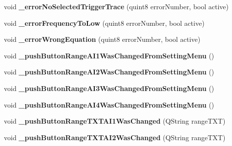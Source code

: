 \begin{DoxyCompactItemize}
\item 
\mbox{\label{class_setting_window_af4dae533a534c486ed9b09ac9bf73613}} 
void {\bfseries \+\_\+error\+No\+Selected\+Trigger\+Trace} (quint8 error\+Number, bool active)
\item 
\mbox{\label{class_setting_window_a6f418e01eac690c8ab0970f5517bda87}} 
void {\bfseries \+\_\+error\+Frequency\+To\+Low} (quint8 error\+Number, bool active)
\item 
\mbox{\label{class_setting_window_ac85c77df564792038d5e11945837efed}} 
void {\bfseries \+\_\+error\+Wrong\+Equation} (quint8 error\+Number, bool active)
\item 
\mbox{\label{class_setting_window_a59bb777c069f6334751b76bac079891c}} 
void {\bfseries \+\_\+push\+Button\+Range\+A\+I1\+Was\+Changed\+From\+Setting\+Menu} ()
\item 
\mbox{\label{class_setting_window_a5466861a6c57c80788da82efc885ae56}} 
void {\bfseries \+\_\+push\+Button\+Range\+A\+I2\+Was\+Changed\+From\+Setting\+Menu} ()
\item 
\mbox{\label{class_setting_window_a0db37304392188ba643dbc1f3035d226}} 
void {\bfseries \+\_\+push\+Button\+Range\+A\+I3\+Was\+Changed\+From\+Setting\+Menu} ()
\item 
\mbox{\label{class_setting_window_a63b66c1e5e2f2bcc9b1a0db2e3728c42}} 
void {\bfseries \+\_\+push\+Button\+Range\+A\+I4\+Was\+Changed\+From\+Setting\+Menu} ()
\item 
\mbox{\label{class_setting_window_a398f86f48bacceb598378574f835ad86}} 
void {\bfseries \+\_\+push\+Button\+Range\+T\+X\+T\+A\+I1\+Was\+Changed} (Q\+String range\+T\+XT)
\item 
\mbox{\label{class_setting_window_a100d0d696fe52129bf792a03b130d312}} 
void {\bfseries \+\_\+push\+Button\+Range\+T\+X\+T\+A\+I2\+Was\+Changed} (Q\+String range\+T\+XT)
\item 
\mbox{\label{class_setting_window_aa7ed52f6f876426ad31d857e6be8d97a}} 

\end{DoxyCompactItemize}
